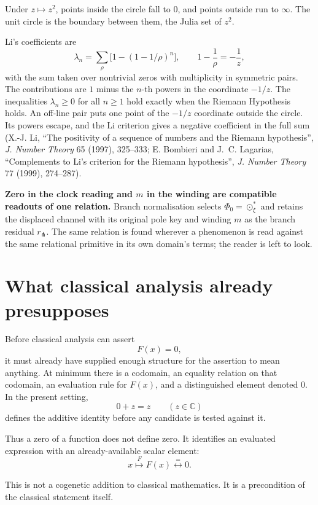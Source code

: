 \documentclass[11pt]{article}
\begin{document}
Under \(z\mapsto z^2\), points inside the circle fall to \(0\), and points outside run to \(\infty\). The unit circle is the boundary between them, the Julia set of \(z^2\).

Li's coefficients are
\[
\lambda_n=\sum_\rho\bigl[1-(1-1/\rho)^n\bigr],
\qquad
1-\frac1\rho=-\frac1z,
\]
with the sum taken over nontrivial zeros with multiplicity in symmetric pairs. The contributions are \(1\) minus the \(n\)-th powers in the coordinate \(-1/z\). The inequalities \(\lambda_n\ge0\) for all \(n\ge1\) hold exactly when the Riemann Hypothesis holds. An off-line pair puts one point of the \(-1/z\) coordinate outside the circle. Its powers escape, and the Li criterion gives a negative coefficient in the full sum (X.-J. Li, ``The positivity of a sequence of numbers and the Riemann hypothesis'', \emph{J. Number Theory} 65 (1997), 325--333; E. Bombieri and J.~C. Lagarias, ``Complements to Li's criterion for the Riemann hypothesis'', \emph{J. Number Theory} 77 (1999), 274--287).

\textbf{Zero in the clock reading and \(m\) in the winding are compatible readouts of one relation.} Branch normalisation selects \(\Phi_0=\odot_\xi^\ast\) and retains the displaced channel with its original pole key and winding \(m\) as the branch residual \(r_{\pitchfork}\). The same relation is found wherever a phenomenon is read against the same relational primitive in its own domain's terms; the reader is left to look.

\section{What classical analysis already presupposes}

Before classical analysis can assert
\[
F(x)=0,
\]
it must already have supplied enough structure for the assertion to mean anything. At minimum there is a codomain, an equality relation on that codomain, an evaluation rule for \(F(x)\), and a distinguished element denoted \(0\). In the present setting,
\[
0+z=z
\qquad
(z\in\mathbb C)
\]
defines the additive identity before any candidate is tested against it.

Thus a zero of a function does not define zero. It identifies an evaluated expression with an already-available scalar element:
\[
x
\overset{F}{\longmapsto}
F(x)
\overset{=}{\longleftrightarrow}
0.
\]

This is not a cogenetic addition to classical mathematics. It is a precondition of the classical statement itself.
\end{document}
